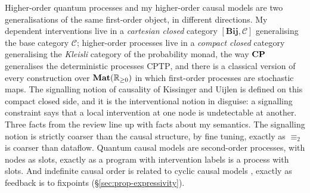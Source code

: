 Higher-order quantum processes and my higher-order causal models are two generalisations of the same first-order object, in different directions. My dependent interventions live in a \emph{cartesian closed} category $[\mathbf{Bij},\mathcal C]$ generalising the base category $\mathcal C$; higher-order processes live in a \emph{compact closed} category generalising the \emph{Kleisli} category of the probability monad, the way $\mathbf{CP}$ generalises the deterministic processes $\mathrm{CPTP}$, and there is a classical version of every construction over $\mathbf{Mat}(\mathbb{R}_{\geq 0})$ in which first-order processes are stochastic maps. The signalling notion of causality of Kissinger and Uijlen is defined on this compact closed side, and it is the interventional notion in disguise: a signalling constraint says that a local intervention at one node is undetectable at another. Three facts from the review line up with facts about my semantics. The signalling notion is strictly coarser than the causal structure, by fine tuning, exactly as $\equiv_2$ is coarser than dataflow. Quantum causal models are second-order processes, with nodes as slots, exactly as a program with intervention labels is a process with slots. And indefinite causal order is related to cyclic causal models \cite{barrett2021cyclic}, exactly as feedback is to fixpoints (\S\ref{sec:prop-expressivity}).

